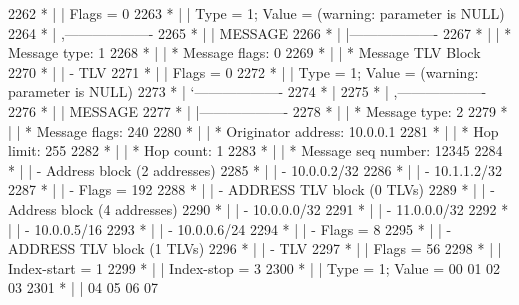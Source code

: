 \begin{DoxyCode}
2262 \textcolor{comment}{         * |    |         Flags = 0}
2263 \textcolor{comment}{         * |    |         Type = 1; Value = (warning: parameter is NULL)}
2264 \textcolor{comment}{         * |    ,-------------------}
2265 \textcolor{comment}{         * |    |  MESSAGE}
2266 \textcolor{comment}{         * |    |-------------------}
2267 \textcolor{comment}{         * |    | * Message type:       1}
2268 \textcolor{comment}{         * |    | * Message flags:  0}
2269 \textcolor{comment}{         * |    | * Message TLV Block}
2270 \textcolor{comment}{         * |    |     - TLV}
2271 \textcolor{comment}{         * |    |         Flags = 0}
2272 \textcolor{comment}{         * |    |         Type = 1; Value = (warning: parameter is NULL)}
2273 \textcolor{comment}{         * |    `-------------------}
2274 \textcolor{comment}{         * |}
2275 \textcolor{comment}{         * |    ,-------------------}
2276 \textcolor{comment}{         * |    |  MESSAGE}
2277 \textcolor{comment}{         * |    |-------------------}
2278 \textcolor{comment}{         * |    | * Message type:       2}
2279 \textcolor{comment}{         * |    | * Message flags:  240}
2280 \textcolor{comment}{         * |    | * Originator address: 10.0.0.1}
2281 \textcolor{comment}{         * |    | * Hop limit:          255}
2282 \textcolor{comment}{         * |    | * Hop count:          1}
2283 \textcolor{comment}{         * |    | * Message seq number: 12345}
2284 \textcolor{comment}{         * |    | - Address block (2 addresses)}
2285 \textcolor{comment}{         * |    |     - 10.0.0.2/32}
2286 \textcolor{comment}{         * |    |     - 10.1.1.2/32}
2287 \textcolor{comment}{         * |    |     - Flags = 192}
2288 \textcolor{comment}{         * |    | - ADDRESS TLV block (0 TLVs)}
2289 \textcolor{comment}{         * |    | - Address block (4 addresses)}
2290 \textcolor{comment}{         * |    |     - 10.0.0.0/32}
2291 \textcolor{comment}{         * |    |     - 11.0.0.0/32}
2292 \textcolor{comment}{         * |    |     - 10.0.0.5/16}
2293 \textcolor{comment}{         * |    |     - 10.0.0.6/24}
2294 \textcolor{comment}{         * |    |     - Flags = 8}
2295 \textcolor{comment}{         * |    | - ADDRESS TLV block (1 TLVs)}
2296 \textcolor{comment}{         * |    |     - TLV}
2297 \textcolor{comment}{         * |    |         Flags = 56}
2298 \textcolor{comment}{         * |    |         Index-start = 1}
2299 \textcolor{comment}{         * |    |         Index-stop = 3}
2300 \textcolor{comment}{         * |    |         Type = 1; Value = 00  01  02  03}
2301 \textcolor{comment}{         * |    |                           04  05  06  07}

\end{DoxyCode}
